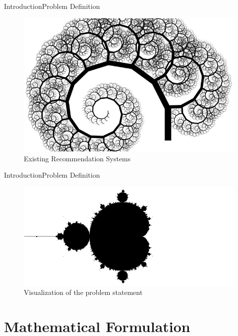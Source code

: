\documentclass[10pt]{beamer}
\begin{document}
\begin{frame}{Introduction}{Problem Definition}
\begin{figure}[t]
    \centering
    \includegraphics[height=\dimexpr11\textheight/16\relax]{reco_exst_1}
    \caption{Existing Recommendation Systems}
  \end{figure}
\end{frame}



\begin{frame}{Introduction}{Problem Definition}
\begin{figure}[t]
    \centering
    \includegraphics[height=\dimexpr11\textheight/16\relax]{Untitled}
    \caption{Visualization of the problem statement}
  \end{figure}
\end{frame}


\section{Mathematical Formulation}
\end{document}
